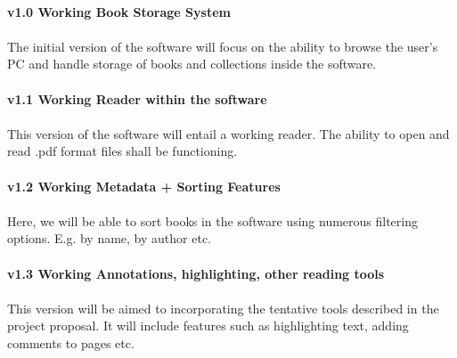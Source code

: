 \documentclass[a4paper, 11pt]{article}
\begin{document}
\paragraph{v1.0 Working Book Storage System}
\paragraph{}
The initial version of the software will focus on the ability to browse the user's PC and handle storage of books and collections inside the software.
\paragraph{v1.1 Working Reader within the software}
\paragraph{}
This version of the software will entail a working reader. The ability to open and read .pdf format files shall be functioning.
\paragraph{v1.2 Working Metadata + Sorting Features}
\paragraph{}
Here, we will be able to sort books in the software using numerous filtering options. E.g. by name, by author etc.
\paragraph{v1.3 Working Annotations, highlighting, other reading tools}
\paragraph{}
This version will be aimed to incorporating the tentative tools described in the project proposal. It will include features such as highlighting text, adding comments to pages etc.
\end{document}
